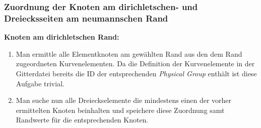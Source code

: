 \subsubsection{Zuordnung der Knoten am dirichletschen- und Dreiecksseiten am neumannschen Rand}
\label{sec:rb_assignment}
\textbf{Knoten am dirichletschen Rand:}
\begin{enumerate}
	\item Man ermittle alle Elementknoten am gewählten Rand aus den dem Rand zugeordneten Kurvenelementen. Da die Definition der Kurvenelemente in der Gitterdatei bereits die ID der entsprechenden \textit{Physical Group} enthält ist diese Aufgabe trivial.
	\item Man suche nun alle Dreieckselemente die mindestens einen der vorher ermittelten Knoten beinhalten und speichere diese Zuordnung samt Randwerte für die entsprechenden Knoten.
\end{enumerate}

